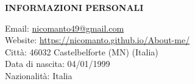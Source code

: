 \begin{minipage}[t]{0.3\textwidth}
		\textbf{INFORMAZIONI PERSONALI}
\end{minipage}%
\hfill
\hfill
\begin{minipage}[t]{0.6\textwidth}
	Email: \href{mailto:me@somewhere.com}{nicomanto49@gmail.com} \\
	Website: \url{https://nicomanto.github.io/About-me/}\\
	Città: 46032 Castelbelforte (MN) (Italia) \\
	Data di nascita: 04/01/1999 \\
	Nazionalità: Italia\\
\end{minipage}%


